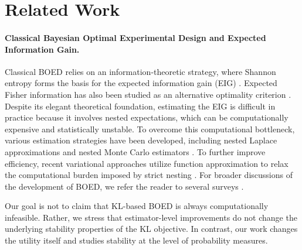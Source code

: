 \documentclass[twoside,11pt]{article}
\begin{document}
\section{Related Work}
\label{sec:related_work}
\paragraph{Classical Bayesian Optimal Experimental Design and Expected Information Gain.} 
Classical BOED relies on an information-theoretic strategy, where Shannon entropy \citep{shannon1948mathematical} forms the basis for the expected information gain (EIG) \citep{lindley1956measure, bernardo1979expected, shewry1987maximum, sebastiani2000maximum}. Expected Fisher information has also been studied as an alternative optimality criterion \citep{walker2016bayesian, overstall2022properties, prangle2023bayesian}. Despite its elegant theoretical foundation, estimating the EIG is difficult in practice because it involves nested expectations, which can be computationally expensive and statistically unstable. To overcome this computational bottleneck, various estimation strategies have been developed, including nested Laplace approximations \citep{long2013fast, beck2018fast} and nested Monte Carlo estimators \citep{myung2013tutorial, rainforth2018nesting}. To further improve efficiency, recent variational approaches utilize function approximation to relax the computational burden imposed by strict nesting \citep{barber2004algorithm,huan2013simulation, kleinegesse2019efficient, foster2019variational, foster2021deep,jin2024continuous,ohn2024adaptive}. For broader discussions of the development of BOED, we refer the reader to several surveys \citep{chaloner1995bayesian, ryan2016review, rainforth2024modern, huan2024optimal}.

Our goal is not to claim that KL-based BOED is always computationally infeasible. Rather, we stress that estimator-level improvements do not change the underlying stability properties of the KL objective. In contrast, our work changes the utility itself and studies stability at the level of probability measures.
\end{document}
